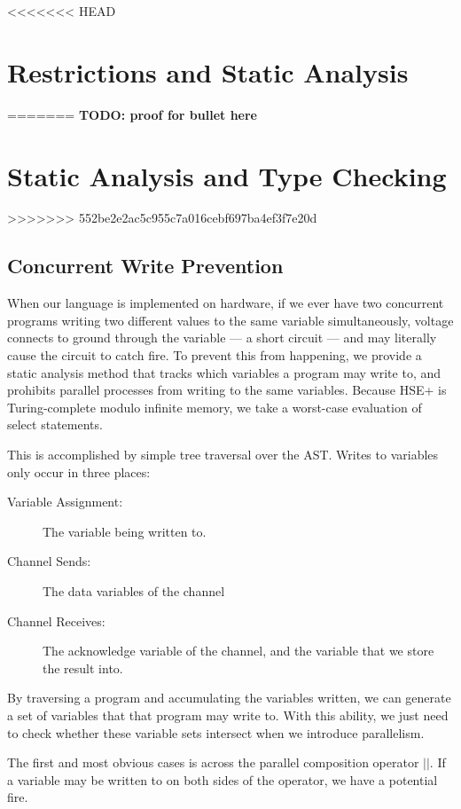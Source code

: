 \documentclass[times, 10pt]{article}
\begin{document}
<<<<<<< HEAD
\section{Restrictions and Static Analysis}
=======
{\bf
TODO: proof for bullet here
}

\section{Static Analysis and Type Checking}
>>>>>>> 552be2e2ac5c955c7a016cebf697ba4ef3f7e20d

\subsection{Concurrent Write Prevention}

When our language is implemented on hardware, if we ever have two concurrent
programs writing two different values to the same variable simultaneously,
voltage connects to ground through the variable --- a short circuit --- and may
literally cause the circuit to catch fire.  To prevent this from happening, we
provide a static analysis method that tracks which variables a program may write
to, and prohibits parallel processes from writing to the same variables.
Because HSE+ is Turing-complete modulo infinite memory, we take a worst-case
evaluation of select statements.

This is accomplished by simple tree traversal over the AST.  Writes to variables
only occur in three places:

\begin{description}
\item[Variable Assignment:] The variable being written to.
\item[Channel Sends:] The data variables of the channel
\item[Channel Receives:] The acknowledge variable of the channel, and the
variable that we store the result into.
\end{description}

By traversing a program and accumulating the variables written, we can generate
a set of variables that that program may write to.  With this ability, we just
need to check whether these variable sets intersect when we introduce
parallelism.

The first and most obvious cases is across the parallel composition operator
$||$.  If a variable may be written to on both sides of the operator, we have a
potential fire.
\end{document}
